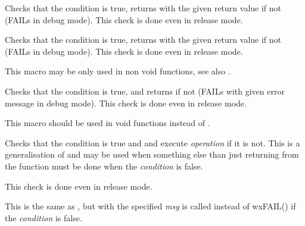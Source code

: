Checks that the condition is true, returns with the given return value if not (FAILs in debug mode).
This check is done even in release mode.

\label{wxcheckmsg}


Checks that the condition is true, returns with the given return value if not (FAILs in debug mode).
This check is done even in release mode.

This macro may be only used in non void functions, see also 
.

\label{wxcheckret}


Checks that the condition is true, and returns if not (FAILs with given error
message in debug mode). This check is done even in release mode.

This macro should be used in void functions instead of 
.

\label{wxcheck2}


Checks that the condition is true and  and execute 
{\it operation} if it is not. This is a generalisation of 
 and may be used when something else than just
returning from the function must be done when the {\it condition} is false.

This check is done even in release mode.

\label{wxcheck2msg}


This is the same as , but 
 with the specified {\it msg} is called
instead of wxFAIL() if the {\it condition} is false.

